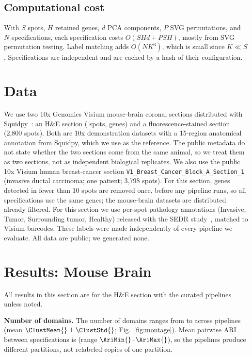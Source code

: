 \subsection{Computational cost}
With $S$ spots, $H$ retained genes, $d$ PCA components, $P$ SVG
permutations, and $N$ specifications, each specification costs
$O(SHd + PSH)$, mostly from SVG permutation testing. Label matching adds
$O(NK^3)$, which is small since $K\ll S$. Specifications are independent
and are cached by a hash of their configuration.

\section{Data}
We use two 10x Genomics Visium mouse-brain coronal sections distributed with
Squidpy~\cite{palla2022squidpy}: an H\&E section (\Nspots{} spots, \Ngenes{}
genes) and a fluorescence-stained section (2{,}800 spots). Both are 10x
demonstration datasets with a 15-region anatomical annotation from Squidpy,
which we use as the reference. The public metadata do not state whether
the two sections come from the same animal, so we treat them as two
sections, not as independent biological replicates. We also use the public
10x Visium human breast-cancer section
\texttt{V1\_Breast\_Cancer\_Block\_A\_Section\_1} (invasive ductal
carcinoma; one patient; 3{,}798 spots). For this section, genes detected in
fewer than 10 spots are removed once, before any pipeline runs, so all
specifications use the same genes; the mouse-brain datasets are distributed
already filtered. For this section we use per-spot pathology annotations
(Invasive, Tumor, Surrounding tumor, Healthy) released with the SEDR
study~\cite{fu2021sedr}, matched to Visium barcodes. These labels were made
independently of every pipeline we evaluate. All data are public; we
generated none.

\section{Results: Mouse Brain}
\label{sec:results}

All results in this section are for the H\&E section with the curated
pipelines unless noted.

\textbf{Number of domains.} The number of domains ranges from
\ClustMin{} to \ClustMax{} across pipelines (mean
$\ClustMean{}\pm\ClustStd{}$; Fig.~\ref{fig:montage}). Mean pairwise ARI
between specifications is \AriMean{} (range $\AriMin{}$--$\AriMax{}$), so
the pipelines produce different partitions, not relabeled copies of one
partition.

